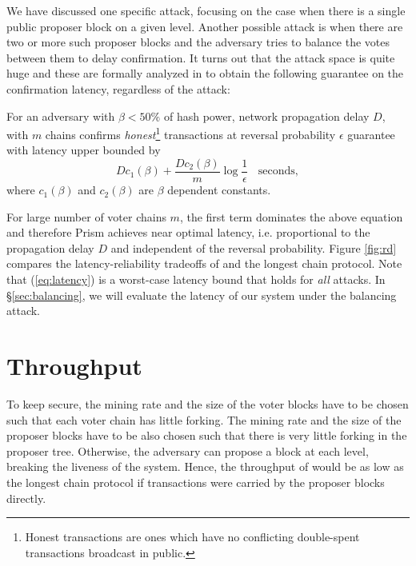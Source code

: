 We have discussed one specific attack, focusing on the case when there is a single public proposer block on a given level. Another possible attack is when there are two or more such proposer blocks and the adversary tries to balance the votes between them to delay confirmation. It turns out that the attack space is quite huge and these are formally analyzed in \cite{prism-theory} to obtain the following guarantee on the confirmation latency, regardless of the attack:

 \begin{theorem} \label{cor:latency_fast}
For an adversary with $\beta< 50\%$ of hash power, network propagation delay $D$, \prism with $m$ chains confirms  \textit{honest}\footnote{Honest transactions are ones which have no conflicting double-spent transactions broadcast in public.} transactions at reversal probability $\epsilon$ guarantee with latency upper bounded by
\begin{equation}
\label{eq:latency}
 Dc_1(\beta) +  \frac{Dc_2(\beta)}{m} \log \frac{1}{\epsilon}\;\; \text{ seconds},
\end{equation}
where $c_1(\beta)$ and $c_2(\beta) $ are $\beta$ dependent constants.
\end{theorem}

For large number of voter chains $m$, the first term dominates the above equation and therefore Prism achieves near optimal latency, i.e. proportional to the propagation delay $D$ and independent of the reversal probability. Figure \ref{fig:rd} compares the latency-reliability tradeoffs of \prism and the longest chain protocol. Note that (\ref{eq:latency}) is a worst-case latency bound that holds for {\em all} attacks. In \S\ref{sec:balancing}, we will evaluate the latency of our system under the balancing attack. 


\section{Throughput}
\label{sec:thruput}

To keep \prism secure, the mining rate and the size of the voter blocks have to be chosen such that each voter chain has little forking. The mining rate and the size of the proposer blocks have to be also chosen such that there is very little forking in the proposer tree. Otherwise, the adversary can propose a block at each level, breaking the liveness of the system. Hence, the throughput of \prism would be as low as the longest chain protocol if transactions were carried by the proposer blocks directly. 


